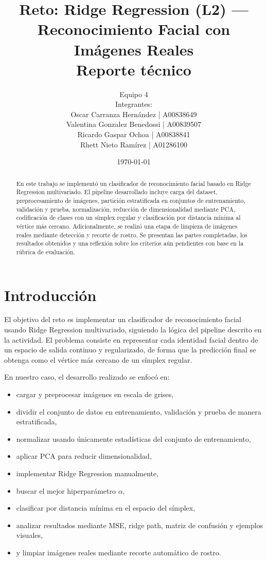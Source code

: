 \documentclass[12pt,a4paper]{article}
\title{\textbf{Reto: Ridge Regression (L2) --- Reconocimiento Facial con Imágenes Reales}\\
\vspace{0.3cm}
\large Reporte técnico}
\author{
Equipo 4 \\
Integrantes: \\
Oscar Carranza Hernández \hspace{0.5cm} | A00838649\\
Valentina Gonzalez Benedossi \hspace{0.5cm} | A00839507\\
Ricardo Gaspar Ochoa \hspace{0.5cm} | A00838841\\
Rhett Nieto Ramírez \hspace{0.5cm} | A01286100
}
\date{\today}
\begin{document}
\maketitle
\thispagestyle{empty}

\vspace{0.5cm}

\begin{abstract}
En este trabajo se implementó un clasificador de reconocimiento facial basado en Ridge Regression multivariado. El pipeline desarrollado incluye carga del dataset, preprocesamiento de imágenes, partición estratificada en conjuntos de entrenamiento, validación y prueba, normalización, reducción de dimensionalidad mediante PCA, codificación de clases con un símplex regular y clasificación por distancia mínima al vértice más cercano. Adicionalmente, se realizó una etapa de limpieza de imágenes reales mediante detección y recorte de rostro. Se presentan las partes completadas, los resultados obtenidos y una reflexión sobre los criterios aún pendientes con base en la rúbrica de evaluación.
\end{abstract}

\newpage
\tableofcontents
\newpage

\section{Introducción}
El objetivo del reto es implementar un clasificador de reconocimiento facial usando Ridge Regression multivariado, siguiendo la lógica del pipeline descrito en la actividad. El problema consiste en representar cada identidad facial dentro de un espacio de salida continuo y regularizado, de forma que la predicción final se obtenga como el vértice más cercano de un símplex regular.

En nuestro caso, el desarrollo realizado se enfocó en:
\begin{itemize}
    \item cargar y preprocesar imágenes en escala de grises,
    \item dividir el conjunto de datos en entrenamiento, validación y prueba de manera estratificada,
    \item normalizar usando únicamente estadísticas del conjunto de entrenamiento,
    \item aplicar PCA para reducir dimensionalidad,
    \item implementar Ridge Regression manualmente,
    \item buscar el mejor hiperparámetro $\alpha$,
    \item clasificar por distancia mínima en el espacio del símplex,
    \item analizar resultados mediante MSE, ridge path, matriz de confusión y ejemplos visuales,
    \item y limpiar imágenes reales mediante recorte automático de rostro.
\end{itemize}
\end{document}
